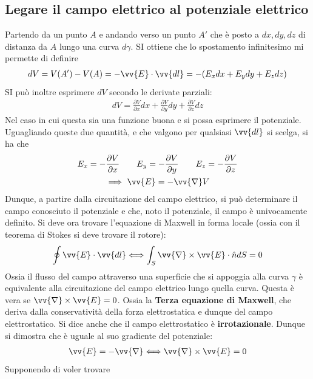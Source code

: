 \documentclass[a4paper, oneside]{article}
\begin{document}
\subsection{Legare il campo elettrico al potenziale elettrico}
Partendo da un punto $A$ e andando verso un punto $A'$ che è posto a $dx, dy, dz$ di distanza
da $A$ lungo una curva $d\gamma$. SI ottiene che lo spostamento infinitesimo  mi permette di definire 
\begin{gather*}
    dV = V(A') - V(A) = -\vv{E}\cdot \vv{dl}  =  -(E_x dx + E_y dy + E_z dz) 
\end{gather*}
SI può inoltre esprimere $dV$ secondo le derivate parziali:
\begin{gather*}
    dV = \frac{\partial V}{\partial x} dx + \frac{\partial V}{\partial y}dy + \frac{\partial V}{\partial z}dz 
\end{gather*}
Nel caso in cui questa sia una funzione buona e si possa esprimere il potenziale. Uguagliando queste due quantità, e che valgono 
per qualsiasi $\vv{dl}$ si scelga, si ha che
\begin{gather*}
    E_x = -\frac{\partial V}{\partial x}  \qquad E_y = - \frac{\partial V}{\partial y}  \qquad E_z = - \frac{\partial V}{\partial z} \\
    \ \Longrightarrow \ \vv{E} = -\vv{\nabla}V     
\end{gather*} 
Dunque, a partire dalla circuitazione del campo elettrico, si può determinare il 
campo conosciuto il potenziale e che, noto il potenziale, il campo è univocamente definito.
Si deve ora trovare l'equazione di Maxwell in forma locale (ossia con il teorema 
di Stokes si deve trovare il rotore):
\begin{gather*}
    \oint \vv{E} \cdot \vv{dl} \Longleftrightarrow   \int_{S} \vv{\nabla} \times \vv{E} \cdot \hat{n} dS  = 0
\end{gather*}
Ossia il flusso del campo attraverso una superficie che 
si appoggia alla curva $\gamma$ è equivalente alla circuitazione 
del campo elettrico lungo quella curva. Questa è vera se $\vv{\nabla} \times \vv{E} = 0$. 
Ossia la \textbf{Terza equazione di Maxwell}, che deriva dalla conservatività 
della forza elettrostatica e dunque del campo elettrostatico. Si dice anche che il 
campo elettrostatico è \textbf{irrotazionale}. Dunque si dimostra che è 
uguale al suo gradiente del potenziale:
\begin{gather*}
    \vv{E} = -\vv{\nabla} \Longleftrightarrow    \vv{\nabla} \times \vv{E} =  0  
\end{gather*}
Supponendo di voler trovare
\end{document}
